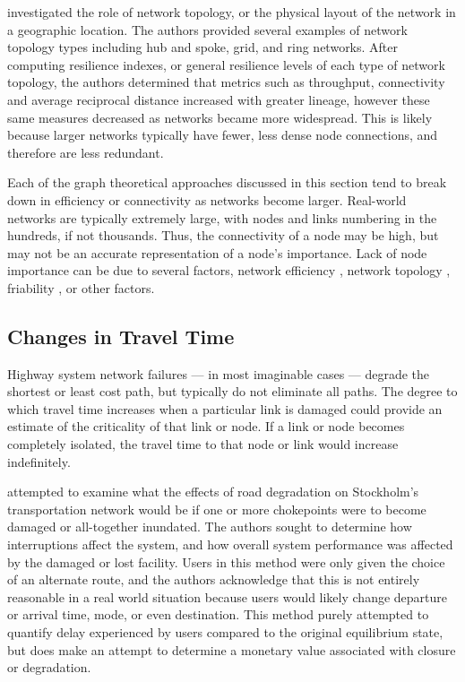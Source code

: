 \citet{zhang2015} investigated the role of network topology, or the physical
layout of the network in a geographic location.
The authors provided several examples of network topology types including
hub and spoke, grid, and
ring networks. After computing resilience indexes, or general resilience
levels of each type of
network topology, the authors determined that metrics such as throughput,
connectivity and average
reciprocal distance increased with greater lineage, however these same measures decreased as
networks became
more widespread. This is likely because larger networks typically have fewer, less dense node
connections, and
therefore are less redundant.

Each of the graph theoretical approaches discussed in this section tend to break
down in efficiency or connectivity as networks become larger. Real-world
networks are typically extremely large, with nodes and links numbering in the
hundreds, if not thousands. Thus, the connectivity of a node may be high, but may
not be an accurate representation of a node's importance. Lack of node importance
can be due to several factors, network efficiency \citet{osei2014}, network topology \citet{zhang2015},
friability \citet{ip2011}, or other factors.

\subsection{Changes in Travel Time}

Highway system network failures --- in most imaginable cases --- degrade
the
shortest or least cost path, but typically do not eliminate all paths.
The degree
to which travel time increases when a particular link is damaged could
provide an estimate of the criticality of that link or node. If a link or node
becomes completely isolated, the travel time to that node or link would
increase indefinitely.

\citet{Berdica2007} attempted to examine what the effects of road
degradation on Stockholm's transportation network would be if one or more
chokepoints were to become damaged or all-together inundated. The authors
sought to determine how interruptions affect the system, and how overall
system performance was affected by the damaged or lost facility. Users in this method were only given the
choice of an alternate route, and the authors acknowledge that this is not
entirely reasonable in a real world situation because users would likely change
departure or arrival time, mode, or even destination. This method purely attempted
to quantify delay experienced by users compared to the original
equilibrium state, but does make an attempt to determine a monetary value
associated with closure or degradation.

